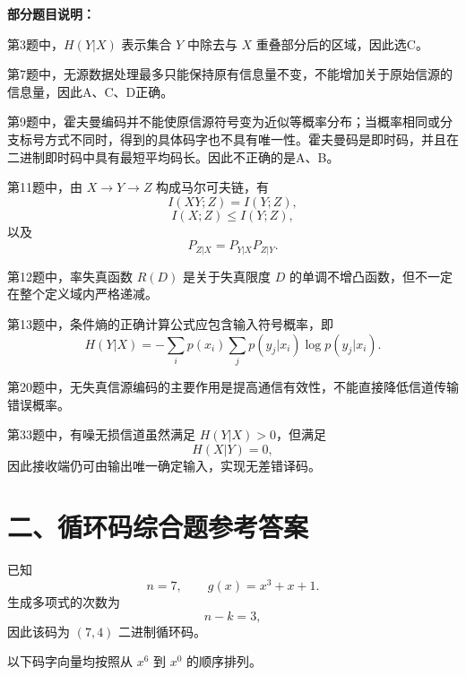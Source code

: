 \documentclass[UTF8,a4paper,12pt]{ctexart}
\begin{document}
\vspace{1em}

\textbf{部分题目说明：}

第3题中，$H(Y|X)$ 表示集合 $Y$ 中除去与 $X$ 重叠部分后的区域，因此选C。

第7题中，无源数据处理最多只能保持原有信息量不变，不能增加关于原始信源的信息量，因此A、C、D正确。

第9题中，霍夫曼编码并不能使原信源符号变为近似等概率分布；当概率相同或分支标号方式不同时，得到的具体码字也不具有唯一性。霍夫曼码是即时码，并且在二进制即时码中具有最短平均码长。因此不正确的是A、B。

第11题中，由 $X\to Y\to Z$ 构成马尔可夫链，有
\[
I(XY;Z)=I(Y;Z),
\]
\[
I(X;Z)\leq I(Y;Z),
\]
以及
\[
P_{Z|X}=P_{Y|X}P_{Z|Y}.
\]

第12题中，率失真函数 $R(D)$ 是关于失真限度 $D$ 的单调不增凸函数，但不一定在整个定义域内严格递减。

第13题中，条件熵的正确计算公式应包含输入符号概率，即
\[
H(Y|X)
=
-\sum_i p(x_i)\sum_jp(y_j|x_i)\log p(y_j|x_i).
\]

第20题中，无失真信源编码的主要作用是提高通信有效性，不能直接降低信道传输错误概率。

第33题中，有噪无损信道虽然满足 $H(Y|X)>0$，但满足
\[
H(X|Y)=0,
\]
因此接收端仍可由输出唯一确定输入，实现无差错译码。


\newpage

\section*{二、循环码综合题参考答案}

已知
\[
n=7,\qquad g(x)=x^3+x+1.
\]
生成多项式的次数为
\[
n-k=3,
\]
因此该码为 $(7,4)$ 二进制循环码。

以下码字向量均按照从 $x^6$ 到 $x^0$ 的顺序排列。
\end{document}
